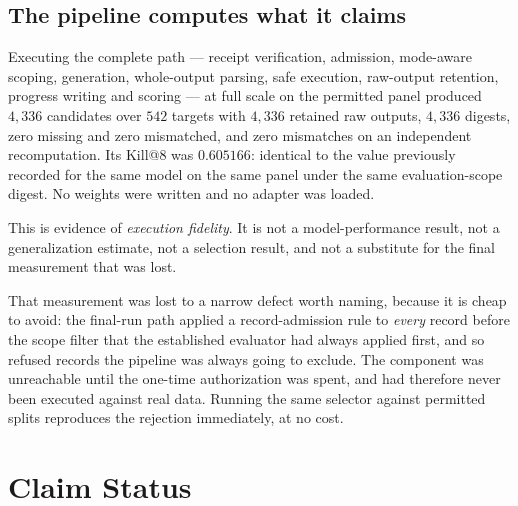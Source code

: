 \documentclass[10pt,conference]{IEEEtran}
\makeatletter
\newcommand{\killk}[1]{Kill@#1}
\makeatother
\begin{document}
\subsection{The pipeline computes what it claims}

Executing the complete path --- receipt verification, admission, mode-aware
scoping, generation, whole-output parsing, safe execution, raw-output retention,
progress writing and scoring --- at full scale on the permitted panel produced
$4{,}336$ candidates over $542$ targets with $4{,}336$ retained raw outputs,
$4{,}336$ digests, zero missing and zero mismatched, and zero mismatches on an
independent recomputation. Its \killk{8} was $0.605166$: identical to the value
previously recorded for the same model on the same panel under the same
evaluation-scope digest. No weights were written and no adapter was loaded.

This is evidence of \emph{execution fidelity}. It is not a model-performance
result, not a generalization estimate, not a selection result, and not a
substitute for the final measurement that was lost.

That measurement was lost to a narrow defect worth naming, because it is cheap
to avoid: the final-run path applied a record-admission rule to \emph{every}
record before the scope filter that the established evaluator had always applied
first, and so refused records the pipeline was always going to exclude. The
component was unreachable until the one-time authorization was spent, and had
therefore never been executed against real data. Running the same selector
against permitted splits reproduces the rejection immediately, at no cost.

\section{Claim Status}
\end{document}
